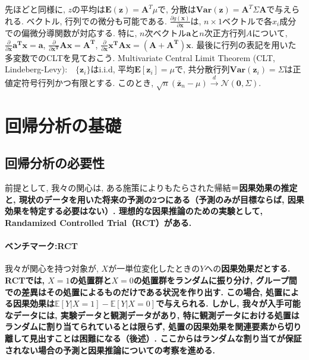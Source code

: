 \documentclass[paper=a4paper,fontsize=10pt]{jlreq}
\begin{document}
先ほどと同様に, $z$の平均は$\mathbf{E(z)}=\mathbf{A}^T\mu$で, 分散は$\mathbf{Var(z)}=\mathbf{A}^T \Sigma \mathbf{A}$で与えられる. ベクトル, 行列での微分も可能である. $\frac{\partial g(\mathbf{x})}{\partial \mathbf{x}}$は, $n\times 1$ベクトルで各$x_i$成分での偏微分導関数が対応する. 特に, $n$次ベクトル$\mathbf{a}$と$n$次正方行列$A$について, $\frac{\partial}{\partial \mathbf{x}}\mathbf{a^T x}=\mathbf{a}$, $\frac{\partial}{\partial \mathbf{x^T}}\mathbf{A x}=\mathbf{A^T}$, $\frac{\partial}{\partial \mathbf{x}}\mathbf{x^T A x}=\mathbf{(A+A^T)x}$. 最後に行列の表記を用いた多変数でのCLTを見ておこう. Multivariate Central Limit Theorem (CLT, Lindeberg-Levy):　$\{\mathbf{z}_i\}$はi.i.d, 平均$\mathbf{E}[\mathbf{z}_i]=\mu$で, 共分散行列$\mathbf{Var}(\mathbf{z}_i)=\Sigma$は正値定符号行列かつ有限とする. このとき, $\sqrt{n}(\bar{\mathbf{z}}_n-\mu) \overset{d}{\to}\mathcal{N}(\mathbf{0},\Sigma)$.\\

\section{回帰分析の基礎}
\subsection{回帰分析の必要性}
前提として, 我々の関心は, ある施策によりもたらされた帰結＝\rmfamily\mcfamily\bfseries{因果効果の推定}\mdseries と, 現状のデータを用いた\rmfamily\mcfamily\bfseries{将来の予測}\mdseries の2つにある（予測のみが目標ならば, 因果効果を特定する必要はない）. 理想的な因果推論のための実験として, \rmfamily\mcfamily\bfseries{Randamized Controlled Trial（RCT）}\mdseries がある.\\

\paragraph{ベンチマーク:RCT}
我々が関心を持つ対象が, $X$が一単位変化したときの$Y$への\rmfamily\mcfamily\bfseries{因果効果}\mdseries だとする. RCTでは, $X=1$の処置群と$X=0$の処置群を\rmfamily\mcfamily\bfseries{ランダム}\mdseries に振り分け, グループ間での差異はその処置によるものだけである状況を作り出す. この場合, 処置による\rmfamily\mcfamily\bfseries{因果効果}\mdseries は$\mathbb{E}[Y|X=1]-\mathbb{E}[Y|X=0]$で与えられる. しかし, 我々が入手可能なデータには, 実験データと観測データがあり, 特に観測データにおける処置はランダムに割り当てられているとは限らず, 処置の因果効果を関連要素から切り離して見出すことは困難になる（後述）. ここからはランダムな割り当てが保証されない場合の予測と因果推論についての考察を進める. \\
\end{document}
